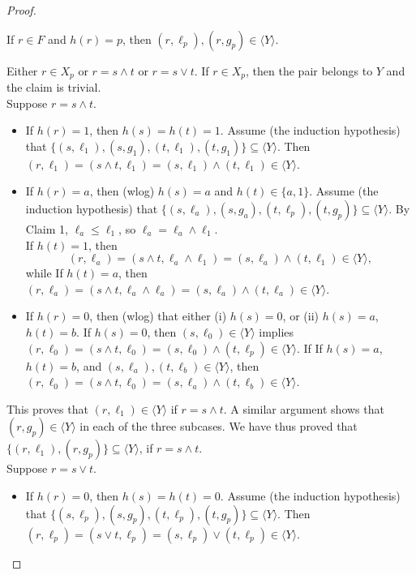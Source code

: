 \begin{proof}
\begin{subclaim}\label{claim:3.4} 
  If $r \in F$ and $h(r) = p$, then $(r, \ell_p), (r, g_p) \in \langle Y \rangle$.
\end{subclaim}
Either $r \in X_p$ or $r = s \wedge t$ or $r = s \vee t$.
If $r \in X_p$, then the pair belongs to $Y$ and the claim is trivial.\\[6pt]
Suppose $r = s \wedge t$.
\begin{itemize}
\item If $h(r) = 1$, then $h(s) = h(t) = 1$.  Assume 
(the induction hypothesis) that 
$\{(s, \ell_1), (s, g_1), (t, \ell_1), (t, g_1)\} \subseteq \langle Y \rangle$.
Then $(r, \ell_1) = (s \wedge t, \ell_1) =  (s, \ell_1) \wedge (t, \ell_1) \in \langle Y \rangle$. 
\item If $h(r) = a$, then (wlog) $h(s) = a$ and $h(t) \in \{a, 1\}$.  Assume 
(the induction hypothesis) that 
$\{(s, \ell_a), (s, g_a), (t, \ell_p), (t, g_p)\} \subseteq \langle Y \rangle$. 
By Claim 1, $\ell_a \leqslant \ell_1$, so $\ell_a = \ell_a \wedge \ell_1$.\\
If $h(t) = 1$, then 
\[(r, \ell_a) = (s \wedge t, \ell_a \wedge \ell_1) =  (s, \ell_a) \wedge (t, \ell_1) \in \langle Y \rangle,\]
while If $h(t) = a$, then $(r, \ell_a) = (s \wedge t, \ell_a \wedge \ell_a) =  (s, \ell_a) \wedge (t, \ell_a) \in \langle Y \rangle$.
  
      \item If $h(r) = 0$, then (wlog) that either (i) $h(s) = 0$, or (ii) $h(s) = a$, $h(t)=b$.  
      If $h(s) = 0$, then $(s, \ell_0) \in \langle Y \rangle$ implies 
      $(r, \ell_0) = (s \wedge t, \ell_0) =  (s, \ell_0) \wedge (t, \ell_p) \in \langle Y \rangle$. If 
      If $h(s) = a$, $h(t) = b$, and
      $(s, \ell_a), (t, \ell_b) \in \langle Y \rangle$, then
      $(r, \ell_0) = (s \wedge t, \ell_0) =  (s, \ell_a) \wedge (t, \ell_b) \in \langle Y \rangle$.
  \end{itemize}
  This proves that $(r, \ell_1) \in \langle Y \rangle$ if $r = s \wedge t$.
  A similar argument shows that $(r, g_p) \in \langle Y \rangle$ in each of the three subcases. 
  We have thus proved that $\{(r, \ell_1), (r, g_p)\}\subseteq \langle Y \rangle$, if $r = s \wedge t$.\\[6pt]
  Suppose $r = s \vee t$.
  \begin{itemize}
  \item If $h(r) = 0$, then $h(s) = h(t) = 0$. Assume (the induction hypothesis) that 
  $\{(s, \ell_p), (s, g_p), (t, \ell_p), (t, g_p)\} \subseteq \langle Y \rangle$. Then 
  $(r, \ell_p) = (s \vee t, \ell_p) =  (s, \ell_p) \vee (t, \ell_p) \in \langle Y \rangle$.


\end{itemize}
\end{proof}
